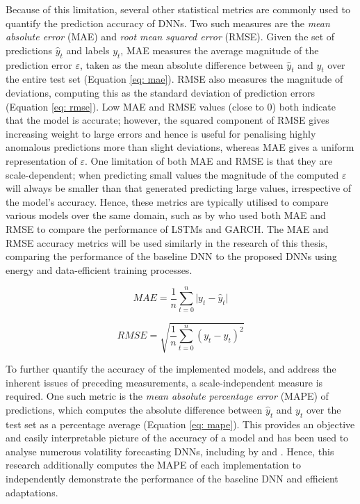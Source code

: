 \documentclass[a4paper, 11pt]{report}
\begin{document}
    Because of this limitation, several other statistical metrics are commonly used to quantify the prediction accuracy of DNNs. Two such measures are the \emph{mean absolute error} (MAE) and \emph{root mean squared error} (RMSE). Given the set of predictions $\hat{y}_t$ and labels $y_t$, MAE measures the average magnitude of the prediction error $\varepsilon$, taken as the mean absolute difference between $\hat{y}_t$ and $y_t$ over the entire test set (Equation \ref{eq: mae}). RMSE also measures the magnitude of deviations, computing this as the standard deviation of prediction errors (Equation \ref{eq: rmse}). Low MAE and RMSE values (close to $0$) both indicate that the model is accurate; however, the squared component of RMSE gives increasing weight to large errors and hence is useful for penalising highly anomalous predictions more than slight deviations, whereas MAE gives a uniform representation of $\varepsilon$. One limitation of both MAE and RMSE is that they are scale-dependent; when predicting small values the magnitude of the computed $\varepsilon$ will always be smaller than that generated predicting large values, irrespective of the model's accuracy. Hence, these metrics are typically utilised to compare various models over the same domain, such as by \citet{rodikov-2022} who used both MAE and RMSE to compare the performance of LSTMs and GARCH. The MAE and RMSE accuracy metrics will be used similarly in the research of this thesis, comparing the performance of the baseline DNN to the proposed DNNs using energy and data-efficient training processes. 


    \begin{equation}
        \label{eq: mae}
        MAE = \frac{1}{n} \sum_{t=0}^n \lvert y_t - \hat{y}_t \lvert
    \end{equation}
    
    \begin{equation}
        \label{eq: rmse}
        RMSE = \sqrt{\frac{1}{n} \sum_{t=0}^n (y_t - \hat{y}_t)^2}
    \end{equation}


    To further quantify the accuracy of the implemented models, and address the inherent issues of preceding measurements, a scale-independent measure is required. One such metric is the \emph{mean absolute percentage error }(MAPE) of predictions, which computes the absolute difference between $\hat{y}_t$ and $y_t$ over the test set as a percentage average (Equation \ref{eq: mape}). This provides an objective and easily interpretable picture of the accuracy of a model and has been used to analyse numerous volatility forecasting DNNs, including by \citet{xiong-2016} and \citet{zhang-2022}. Hence, this research additionally computes the MAPE of each implementation to independently demonstrate the performance of the baseline DNN and efficient adaptations.
\end{document}
